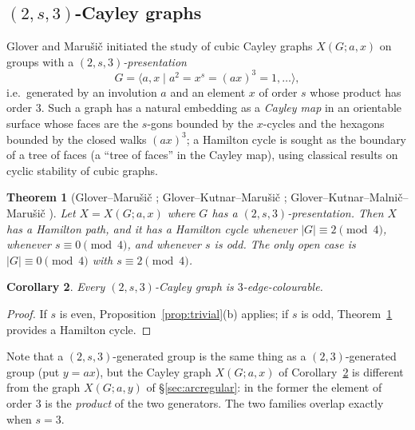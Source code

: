 \documentclass[11pt,a4paper]{article}
\newtheorem{theorem}{Theorem}[section]
\newtheorem{corollary}[theorem]{Corollary}
\theoremstyle{definition}
\theoremstyle{remark}
\newcommand{\X}[3]{X(#1;#2,#3)}
\begin{document}
\subsection{$(2,s,3)$-Cayley graphs}
Glover and Maru\v{s}i\v{c} \cite{GM07} initiated the study of cubic Cayley graphs $\X{G}{a}{x}$ on groups with a \emph{$(2,s,3)$-presentation}
\[
G=\langle a,x \mid a^2=x^s=(ax)^3=1,\dots\rangle ,
\]
i.e.\ generated by an involution $a$ and an element $x$ of order $s$ whose product has order $3$.  Such a graph has a natural embedding as a \emph{Cayley map} in an orientable surface whose faces are the $s$-gons bounded by the $x$-cycles and the hexagons bounded by the closed walks $(ax)^3$; a Hamilton cycle is sought as the boundary of a tree of faces (a ``tree of faces'' in the Cayley map), using classical results on cyclic stability of cubic graphs.

\begin{theorem}[Glover--Maru\v{s}i\v{c} \cite{GM07}; Glover--Kutnar--Maru\v{s}i\v{c} \cite{GKM09}; Glover--Kutnar--Malni\v{c}--Maru\v{s}i\v{c} \cite{GKMM12}]\label{thm:2s3}
Let $X=\X{G}{a}{x}$ where $G$ has a $(2,s,3)$-presentation.  Then $X$ has a Hamilton path, and it has a Hamilton cycle whenever $|G|\equiv2\pmod4$, whenever $s\equiv0\pmod4$, and whenever $s$ is odd.  The only open case is $|G|\equiv0\pmod4$ with $s\equiv2\pmod4$.
\end{theorem}

\begin{corollary}\label{cor:2s3}
Every $(2,s,3)$-Cayley graph is $3$-edge-colourable.
\end{corollary}
\begin{proof}
If $s$ is even, Proposition~\ref{prop:trivial}(b) applies; if $s$ is odd, Theorem~\ref{thm:2s3} provides a Hamilton cycle.
\end{proof}

Note that a $(2,s,3)$-generated group is the same thing as a $(2,3)$-generated group (put $y=ax$), but the Cayley graph $\X{G}{a}{x}$ of Corollary~\ref{cor:2s3} is different from the graph $\X{G}{a}{y}$ of \S\ref{sec:arcregular}: in the former the element of order $3$ is the \emph{product} of the two generators.  The two families overlap exactly when $s=3$.
\end{document}

